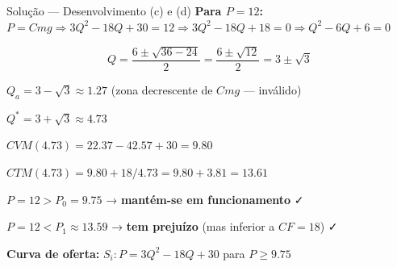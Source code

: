 \documentclass[
  ignorenonframetext,
  handout]{beamer}
\begin{document}
\begin{frame}{Solução --- Desenvolvimento (c) e (d)}
\label{soluuxe7uxe3o-desenvolvimento-c-e-d}
\textbf{Para \(P = 12\):}
\(P = Cmg \Rightarrow 3Q^2 - 18Q + 30 = 12 \Rightarrow 3Q^2 - 18Q + 18 = 0 \Rightarrow Q^2 - 6Q + 6 = 0\)

\[Q = \frac{6 \pm \sqrt{36 - 24}}{2} = \frac{6 \pm \sqrt{12}}{2} = 3 \pm \sqrt{3}\]

\(Q_a = 3 - \sqrt{3} \approx 1.27\) (zona decrescente de \(Cmg\) ---
inválido)

\(Q^* = 3 + \sqrt{3} \approx 4.73\)

\(CVM(4.73) = 22.37 - 42.57 + 30 = 9.80\)

\(CTM(4.73) = 9.80 + 18/4.73 = 9.80 + 3.81 = 13.61\)

\(P = 12 > P_0 = 9.75\) → \textbf{mantém-se em funcionamento} ✓

\(P = 12 < P_1 \approx 13.59\) → \textbf{tem prejuízo} (mas inferior a
\(CF = 18\)) ✓

\textbf{Curva de oferta:} \(S_i\!: P = 3Q^2 - 18Q + 30\) para
\(P \geq 9.75\)
\end{frame}
\end{document}
